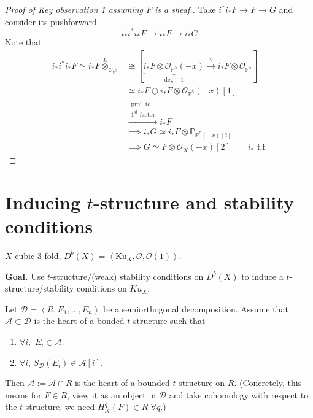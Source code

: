 \begin{proof}[Proof of Key observation 1
assuming $F$ is a sheaf.]
Take $i^*i_*F \to F \to G$ and consider its
pushforward
$$
i_*i^*i_*F \to i_* F \to i_*G
$$
Note that
$$
\begin{aligned}
i_*i^*i_*F \simeq
i_*F\overset{L}{\otimes}_{\mathcal{O}
_{\mathbb{P}^5}}
&\cong \left[
\underbrace{i_* F \otimes\mathcal{O}
_{\mathbb{P}^5}(-x)}_{\text{deg}-1}
\xrightarrow{\vee}
i_*F\otimes \mathcal{O}_{\mathbb{P}^5}\right]
\\
&  \simeq i_*F \oplus i_*F\otimes
\mathcal{O}_{\mathbb{P}^5}(-x)[1]\\
&\xrightarrow{\substack{ \text{proj.
to}\\\text{$1^{\text{st}}$ factor}}}i_*F\\
&  \implies i_*G \simeq i_* F \otimes
\mathbb{P}_{\mathbb{P}^5(-x)[2]}\\
& \implies G \simeq F \otimes
\mathcal{O}_X(-x)[2]\qquad i_*\text{ f.f.}
\end{aligned}
$$

\end{proof}

\section{Inducing $t$-structure and stability
conditions}
\label{nasak-label-003}

\begin{example}
\label{example-cubic-3-fold}
$X$ cubic 3-fold,
$D^b(X)=\left\langle{}\text{Ku}_X,\mathcal{O},
\mathcal{O}(1)\right\rangle{}$.
\end{example}

\noindent
{\bf Goal.} Use $t$-structure/(weak)
stability conditions on $D^b(X)$ to induce a
$t$-structure/stability conditions on $Ku_X$.

\medskip\noindent
\begin{proposition}
\label{proposition-key}
Let
$\mathcal{D}=\left\langle{}R,E_1,\ldots,E_n\right\rangle{}$
be a semiorthogonal decomposition. Assume
that $\mathcal{A} \subset \mathcal{D}$ is the
heart of a bonded $t$-structure such that
\begin{enumerate}
\item $\forall i,$ $E_i \in \mathcal{A}$.
\item $\forall i$, $S_{\mathcal{D}}(E_i) \in
\mathcal{A}[i]$.
\end{enumerate}
Then $\mathcal{A}:=\mathcal{A}\cap R$ is the
heart of a bounded $t$-structure on $R$.
(Concretely, this means for $F \in R$, view
it as an object in $\mathcal{D}$ and take
cohomology with respect to the $t$-structure,
we need $H_{\mathcal{A}}^q(F) \in R$ $\forall
q$.)
\end{proposition}

